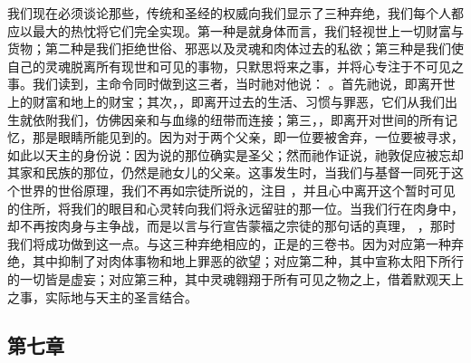 我们现在必须谈论那些，传统和圣经的权威向我们显示了三种弃绝，我们每个人都应以最大的热忱将它们完全实现。第一种是就身体而言，我们轻视世上一切财富与货物；第二种是我们拒绝世俗、邪恶以及灵魂和肉体过去的私欲；第三种是我们使自己的灵魂脱离所有现世和可见的事物，只默思将来之事，并将心专注于不可见之事。我们读到，主命令同时做到这三者，当时祂对他说： 。首先祂说，即离开世上的财富和地上的财宝；其次，，即离开过去的生活、习惯与罪恶，它们从我们出生就依附我们，仿佛因亲和与血缘的纽带而连接；第三，，即离开对世间的所有记忆，那是眼睛所能见到的。因为对于两个父亲，即一位要被舍弃，一位要被寻求，如此以天主的身份说：因为说的那位确实是圣父；然而祂作证说，祂敦促应被忘却其家和民族的那位，仍然是祂女儿的父亲。这事发生时，当我们与基督一同死于这个世界的世俗原理，我们不再如宗徒所说的，注目 ，并且心中离开这个暂时可见的住所，将我们的眼目和心灵转向我们将永远留驻的那一位。当我们行在肉身中，却不再按肉身与主争战，而是以言与行宣告蒙福之宗徒的那句话的真理， ，那时我们将成功做到这一点。与这三种弃绝相应的，正是的三卷书。因为对应第一种弃绝，其中抑制了对肉体事物和地上罪恶的欲望；对应第二种，其中宣称太阳下所行的一切皆是虚妄；对应第三种，其中灵魂翱翔于所有可见之物之上，借着默观天上之事，实际地与天主的圣言结合。\par


\subsection{第七章}

\par

